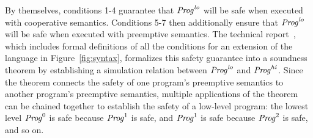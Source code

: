 By themselves, conditions 1-4 guarantee that $\mathit{Prog}^{\mathit{lo}}$ will be safe when executed with cooperative semantics.
Conditions 5-7 then additionally ensure that $\mathit{Prog}^{\mathit{lo}}$ will be safe when executed with preemptive semantics.
The technical report~\cite{gc-techreport},
which includes formal definitions of all the conditions for an extension of the language in Figure~\ref{fig:syntax},
formalizes this safety guarantee into a soundness theorem by establishing a simulation relation between $\mathit{Prog}^{\mathit{lo}}$ and $\mathit{Prog}^{\mathit{hi}}$.
Since the theorem connects the safety of one program's preemptive semantics to another program's preemptive semantics,
multiple applications of the theorem can be chained together to establish the safety of a low-level program:
the lowest level $\mathit{Prog}^0$ is safe because $\mathit{Prog}^1$ is safe, and $\mathit{Prog}^1$ is safe because $\mathit{Prog}^2$ is safe, and so on.

